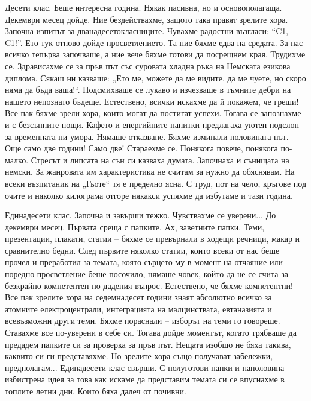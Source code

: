 \begin{multicols}{3}
Десети клас. Беше интересна година. Някак пасивна, но и основополагаща. Декември 
месец дойде. Ние бездействахме, защото така правят зрелите хора. Започна изпитът 
за дванадесетокласниците. Чувахме радостни възгласи: “C1, C1!”. Ето тук отново 
дойде просветлението. Та ние бяхме едва на средата. За нас всичко тепърва 
започваше, а ние вече бяхме готови да посрещнем края. Трудихме се. Здрависахме 
се за пръв път със суровата хладна ръка на Немската езикова диплома. Сякаш ни 
казваше: „Ето ме, можете да ме видите, да ме чуете, но скоро няма да бъда 
ваша!“. Подсмихваше се лукаво и изчезваше в тъмните дебри на нашето непознато 
бъдеще.  Естествено, всички искахме да й покажем, че греши! Все пак бяхме зрели 
хора, които могат да постигат успехи. Тогава се запознахме и с безсънните нощи. 
Кафето и енергийните напитки предлагаха уютен подслон за временната ни умора. 
Нямаше отказване. Бяхме изминали половината път. Още само две години! Само две! 
Стараехме се. Понякога повече, понякога по-малко. Стресът и липсата на сън си 
казваха думата. Започнаха и сънищата на немски. За жанровата им характеристика 
не считам за нужно да обяснявам. На всеки възпитаник на „Гьоте“ тя е пределно 
ясна. С труд, пот на чело, кръгове под очите и няколко килограма отгоре някакси 
успяхме да избутаме и тази година.

Единадесети клас. Започна и завърши тежко. Чувствахме се уверени... До декември 
месец. Първата среща с папките. Ах, заветните папки. Теми, презентации, плакати, 
статии – бяхме се превърнали в ходещи речници, макар и сравнително бедни. След 
първите няколко статии, които всеки от нас беше прочел и преработил за темата, 
която сърцето му в момент на отчаяние или поредно просветление беше посочило, 
нямаше човек, който да не се счита за безкрайно компетентен по дадения въпрос. 
Естествено, че бяхме компетентни! Все пак зрелите хора на седемнадесет години 
знаят абсолютно всичко за атомните електроцентрали, интеграцията на 
малцинствата, евтаназията и всевъзможни други теми. Бяхме пораснали – изборът на 
теми го говореше. Ставахме все по-уверени в себе си. Тогава дойде моментът, 
когато трябваше да предадем папките си за проверка за пръв път. Нещата изобщо не 
бяха такива, каквито си ги представяхме. Но зрелите хора също получават 
забележки, предполагам... Единадесети клас свърши. С полуготови папки и 
наполовина избистрена идея за това как искаме да представим темата си се 
впуснахме в топлите летни дни. Които бяха далеч от почивни.


\end{multicols}
